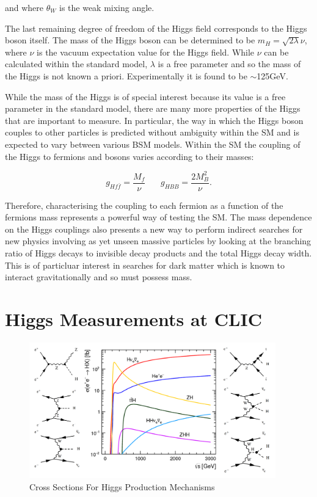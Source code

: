 and where $\theta_{W}$ is the weak mixing angle.

The last remaining degree of freedom of the Higgs field corresponds to the Higgs boson itself. The mass of the Higgs boson can be determined to be $m_{H}=\sqrt{2\lambda}\nu$, where $\nu$ is the vacuum expectation value for the Higgs field. While $\nu$ can be calculated within the standard model, $\lambda$ is a free parameter and so the mass of the Higgs is not known a priori. Experimentally it is found to be $\sim$125GeV\cite{:2012gk,Chatrchyan:2012xdj}.

While the mass of the Higgs is of special interest because its value is a free parameter in the standard model, there are many more properties of the Higgs that are important to measure. In particular, the way in which the Higgs boson couples to other particles is predicted without ambiguity within the \ac{SM} and is expected to vary between various \ac{BSM} models. Within the \ac{SM} the coupling of the Higgs to fermions and bosons varies according to their masses:


\begin{equation}
g_{Hf\bar{f}}=\frac{M_f}{\nu} ~~~~~~~~    g_{HBB}=\frac{2M_B^2}{\nu} .
\end{equation}

Therefore, characterising the coupling to each fermion as a function of the fermions mass represents a powerful way of testing the \ac{SM}. The mass dependence on the Higgs couplings also presents a new way to perform indirect searches for new physics involving as yet unseen massive particles by looking at the branching ratio of Higgs decays to invisible decay products and the total Higgs decay width. This is of particluar interest in searches for dark matter which is known to interact gravitationally and so must possess mass. 

\section{Higgs Measurements at CLIC}
\begin{figure}
  \centering
  \includegraphics[width=0.95\textwidth,keepaspectratio]{Theory/fig/HiggsProcessesExtra.png}
  \caption[Cross Sections For Higgs Production Mechanisms]{Cross Sections For Higgs Production Mechanisms \cite{Abramowicz:2016zbo}}
  \label{fig:higgsXSecs}
\end{figure}

